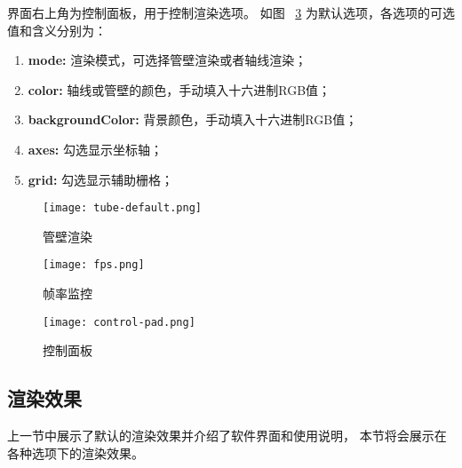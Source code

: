界面右上角为控制面板，用于控制渲染选项。
如图 ~\ref{fig:control-pad} 为默认选项，各选项的可选值和含义分别为：

\begin{enumerate}
\item \textbf{mode: }渲染模式，可选择管壁渲染或者轴线渲染；
\item \textbf{color: }轴线或管壁的颜色，手动填入十六进制RGB值；
\item \textbf{backgroundColor: }背景颜色，手动填入十六进制RGB值；
\item \textbf{axes: }勾选显示坐标轴；
\item \textbf{grid: }勾选显示辅助栅格；
\end{enumerate}

\begin{figure}
\centering
\texttt{[image: tube-default.png]}
\caption{管壁渲染}
\label{fig:tube-default}
\end{figure}

\begin{figure}
\centering
\texttt{[image: fps.png]}
\caption{帧率监控}
\label{fig:fps}
\end{figure}

\begin{figure}
\centering
\texttt{[image: control-pad.png]}
\caption{控制面板}
\label{fig:control-pad}
\end{figure}
\FloatBarrier

\subsection{渲染效果}
上一节中展示了默认的渲染效果并介绍了软件界面和使用说明，
本节将会展示在各种选项下的渲染效果。

